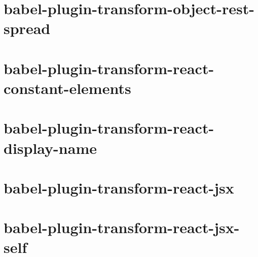 \documentclass[twoside]{book}
\newcommand{\+}{\discretionary{\mbox{\scriptsize$\hookleftarrow$}}{}{}}
\begin{document}
\chapter{babel-\/plugin-\/transform-\/object-\/rest-\/spread}
\label{md__c_1_workspace_demo_src_main_script_node_modules_babel-plugin-transform-object-rest-spread__r_e_a_d_m_e}

\chapter{babel-\/plugin-\/transform-\/react-\/constant-\/elements}
\label{md__c_1_workspace_demo_src_main_script_node_modules_babel-plugin-transform-react-constant-elements__r_e_a_d_m_e}

\chapter{babel-\/plugin-\/transform-\/react-\/display-\/name}
\label{md__c_1_workspace_demo_src_main_script_node_modules_babel-plugin-transform-react-display-name__r_e_a_d_m_e}

\chapter{babel-\/plugin-\/transform-\/react-\/jsx}
\label{md__c_1_workspace_demo_src_main_script_node_modules_babel-plugin-transform-react-jsx__r_e_a_d_m_e}

\chapter{babel-\/plugin-\/transform-\/react-\/jsx-\/self}
\label{md__c_1_workspace_demo_src_main_script_node_modules_babel-plugin-transform-react-jsx-self__r_e_a_d_m_e}

\end{document}
